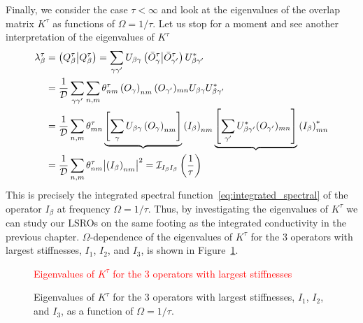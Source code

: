 Finally, we consider the case \(\tau < \infty\) and look at the eigenvalues
of the overlap matrix \(K^{\tau}\) as functions of \(\Omega = 1/\tau\). Let us stop
for a moment and see another interpretation of the eigenvalues of \(K^{\tau}\)
\begin{align}
  \lambda^{\tau}_{\beta} &= \left(Q_{\beta}^{\tau} \middle| Q_{\beta}^{\tau}\right) = \sum_{\gamma\gamma^{\prime}}
  U_{\beta\gamma}\left(\bar{O}^{\tau}_{\gamma} \middle| \bar{O}^{\tau}_{\gamma^{\prime}}\right){U}^{\ast}_{\beta\gamma^{\prime}}\nonumber\\
  &= \frac{1}{\mathcal{D}} \sum_{\gamma\gamma^{\prime}}\sum_{n,m} \theta_{nm}^{\tau}
  \left(O_{\gamma}\right)_{nm} (O_{\gamma^{\prime}})_{mn} U_{\beta\gamma} {U}^{\ast}_{\beta\gamma^{\prime}}\nonumber\\
  &= \frac{1}{\mathcal{D}} \sum_{n,m} \theta_{mn}^{\tau} \underbrace{\left[\sum_{\gamma}U_{\beta\gamma} \left(O_{\gamma}\right)_{nm}\right]}{\left(I_{\beta}\right)_{nm}}
  \underbrace{\left[\sum_{\gamma^{\prime}}{U}^{\ast}_{\beta\gamma^{\prime}} (O_{\gamma^{\prime}})_{mn}\right]}{\left(I_{\beta}\right)^{\ast}_{mn}}\nonumber\\
  &= \frac{1}{\mathcal{D}} \sum_{n,m} \theta_{nm}^{\tau} \abs{\left(I_{\beta}\right)_{nm}}^2 = \mathcal{I}_{I_{\beta}I_{\beta}}\left(\frac{1}{\tau}\right)
\end{align} 
This is precisely the integrated spectral function~\eqref{eq:integrated_spectral} of the operator \(I_{\beta}\) at frequency \(\Omega = 1/\tau\).
Thus, by investigating the eigenvalues of \(K^{\tau}\) we can study our LSROs on the same footing as the integrated
conductivity in the previous chapter. \(\Omega\)-dependence of the eigenvalues of \(K^{\tau}\) for the 3 operators
with largest stiffnesses, \(I_1\), \(I_2\), and \(I_3\), is shown in Figure~\ref{fig:lsro_eigenvalues}.

\begin{figure}[htbp]
  \centering
  \textcolor{red}{Eigenvalues of \(K^{\tau}\) for the 3 operators with largest stiffnesses}
  \caption{Eigenvalues of \(K^{\tau}\) for the 3 operators with largest stiffnesses, \(I_1\), \(I_2\), and \(I_3\),
  as a function of \(\Omega = 1/\tau\).}
  \label{fig:lsro_eigenvalues}
\end{figure}

